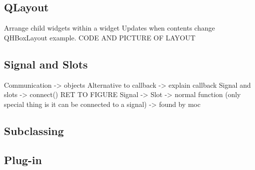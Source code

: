 \subsection{QLayout}
Arrange child widgets within a widget
Updates when contents change
QHBoxLayout example. CODE AND PICTURE OF LAYOUT

\subsection{Signal and Slots}
Communication -> objects
Alternative to callback -> explain callback
Signal and slots -> connect() RET TO FIGURE
Signal -> 
Slot -> normal function (only special thing is it can be connected to a signal) -> found by moc


\subsection{Subclassing}

\subsection{Plug-in}


